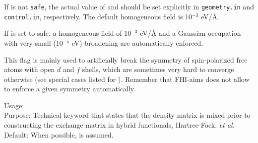 If  is not \texttt{safe}, the actual value of
 and  should be
set explicitly in \texttt{geometry.in} and \texttt{control.in},
respectively. The default homogeneous field is 10$^{-3}$ eV/{\AA}.

If  is set to safe, a homogeneous field of 10$^{-3}$
eV/{\AA} and a Gaussian occupation with very small (10$^{-5}$ eV)
broadening are automatically enforced.

This flag is mainly used to artificially break the symmetry of
spin-polarized free atoms with open $d$ and $f$ shells, which are
sometimes very hard to converge otherwise (see special cases listed
for ). Remember that FHI-aims does not allow to enforce
a given symmetry automatically.


{
  \noindent
  Usage:  \\[1.0ex]
  Purpose: Technical keyword that states that the density matrix is
    mixed prior to constructing the exchange matrix in hybrid
    functionals, Hartree-Fock, \emph{et al.} \\[1.0ex]
  Default: When possible,  is
    assumed. 
}


